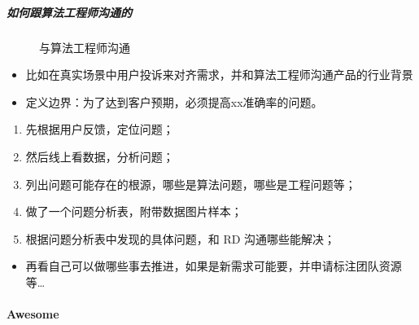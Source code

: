\documentclass[letterpaper,10pt,english]{sphinxmanual}
\begin{document}
\subparagraph{如何跟算法工程师沟通的}
\label{\detokenize{chapter_introduction/AI_PM:id34}}
\begin{figure}[H]
\centering
\capstart

\noindent{}
\caption{与算法工程师沟通\sphinxfootnotemark[302]}\label{\detokenize{chapter_introduction/AI_PM:id65}}\end{figure}
%
\begin{footnotetext}[302]\sphinxAtStartFootnote
{}
%
\end{footnotetext}\ignorespaces \begin{itemize}
\item {} 
比如在真实场景中用户投诉来对齐需求，并和算法工程师沟通产品的行业背景

\item {} 
定义边界：为了达到客户预期，必须提高xx准确率的问题。

\end{itemize}
\begin{enumerate}
%
\item {} 
先根据用户反馈，定位问题；

\item {} 
然后线上看数据，分析问题；

\item {} 
列出问题可能存在的根源，哪些是算法问题，哪些是工程问题等；

\item {} 
做了一个问题分析表，附带数据图片样本；

\item {} 
根据问题分析表中发现的具体问题，和 RD 沟通哪些能解决；

\end{enumerate}
\begin{itemize}
\item {} 
再看自己可以做哪些事去推进，如果是新需求可能要，并申请标注团队资源等…

\end{itemize}


\paragraph{Awesome}
\label{\detokenize{chapter_introduction/AI_PM:awesome}}
\end{document}
